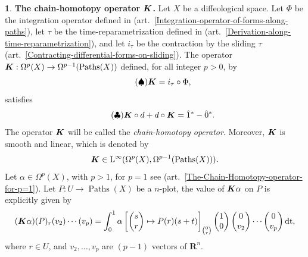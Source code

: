 \documentclass[11pt,reqno]{amsart}
\theoremstyle{definition}
\newtheorem{article}{}
\newcommand{\artlabel}[1]{{\bf #1.}}
\newcommand{\RR}{{\mathbf R}}
\def \L{{L}}
\def \P{{P}}
\def \U{{U}}
\def \X{{X}}
\newcommand{\eK}{\mbox{\boldmath $K$}}
\newcommand{\art}[1]{{(art.~\ref{#1})}}
\newcommand{\DForms}{\Omega}
\newcommand{\Paths}{\operatorname{Paths}}
\newcommand{\source}{\hat 0}
\newcommand{\but}{\hat 1}
\newcommand{\DLin}{\operatorname{\L^\infty}}
\newcommand{\dt}{\operatorname{dt}}
\begin{document}
  \begin{article}\artlabel{The chain-homotopy operator $\eK$} 
    \label{The-chain-homotopy-operator-K}
    Let $\X$ be a diffeological space. Let $\Phi$ be the
    integration operator defined in
    \art{Integration-operator-of-forms-along-paths},
    let $\tau$ be the time-reparametrization defined in
    \art{Derivation-along-time-reparametrization}, and let
    $i_\tau$ be the contraction by the sliding $\tau$
    \art{Contracting-differential-forms-on-sliding}. The
    operator $\eK: \DForms^p(\X) \to
      \DForms^{p-1}(\Paths(\X))$ defined, for all integer $p>0$, by
    \begin{equation}\tag{$\spadesuit$} 
      \label{defOH}
      \eK =  i_\tau \circ \Phi,
    \end{equation} 
    satisfies  
    \begin{equation}\tag{$\clubsuit$} \label{ophom}
      \eK \circ d +d  \circ \eK =
      \but^* - \source^*.
    \end{equation}
    The operator $\eK$ will be called the {\em
    chain-homotopy operator}. Moreover, $\eK$ is 
    smooth and linear, which is denoted by
    $$
    \eK \in \DLin(\DForms^p(\X), \DForms^{p-1}(\Paths(\X))).
      $$ 
    Let $\alpha \in \DForms^p(\X)$, with $p>1$, for
    $p=1$ see \art{The-Chain-Homotopy-operator-for-p=1}. Let
    $\P : \U \to \Paths(\X)$ be a $n$-plot, the value of
    $\eK\alpha$ on $\P$ is explicitly given by
    $$
      (\eK\alpha)(\P)_r(v_2) \cdots (v_{p}) =
      \int_0^1 \alpha \left[ \begin{pmatrix}s \\ r\end{pmatrix} \mapsto \P(r)(s
      + t) \right]_{0 \choose r} \begin{pmatrix}1 \\ 0\end{pmatrix}
      \begin{pmatrix}0 \\ v_2\end{pmatrix} \cdots \begin{pmatrix}0 \\ v_{p}\end{pmatrix} \dt,
      $$
      where $r \in \U$, and $v_2,\ldots,v_{p}$ are $(p-1)$ vectors of $\RR^n$. 
  \end{article} %
  
\end{document}
